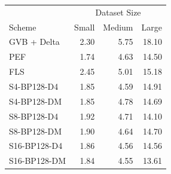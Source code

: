 \begin{tabular}{lrrr}
\toprule
 & \multicolumn{3}{c}{Dataset Size} \\
Scheme & Small & Medium & Large \\
\midrule
GVB + Delta & 2.30 & 5.75 & 18.10 \\
PEF & 1.74 & 4.63 & 14.50 \\
FLS & 2.45 & 5.01 & 15.18 \\
S4-BP128-D4 & 1.85 & 4.59 & 14.91 \\
S4-BP128-DM & 1.85 & 4.78 & 14.69 \\
S8-BP128-D4 & 1.92 & 4.71 & 14.10 \\
S8-BP128-DM & 1.90 & 4.64 & 14.70 \\
S16-BP128-D4 & 1.86 & 4.56 & 14.56 \\
S16-BP128-DM & 1.84 & 4.55 & 13.61 \\
\bottomrule
\end{tabular}
